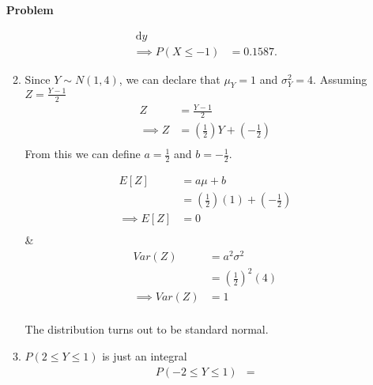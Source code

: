\documentclass[12pt]{article}
\newenvironment{Ex}{\textbf{Problem}\vspace{.75em}\\}{}
\newcommand{\dd}[1]{\:\mathrm{d}{#1}}
\begin{document}
\begin{enumerate}
\begin{Ex}
\begin{solution}
\begin{enumerate}
\begin{multicols}{2}
\begin{equation}
\begin{aligned}
              \dd{y} \\
              \implies P(X \le -1 )&= 0.1587.
            \end{aligned}
          \end{equation}
        \end{multicols}
      \item Since $Y \sim N(1,4)$, we can declare that $\mu_Y = 1$ and
        $\sigma^2_Y = 4$. Assuming $Z = \frac{Y-1}{2}$
        \begin{equation}
          \label{eq:2b-z}
          \begin{aligned}
            Z &= \frac{Y-1}{2} \\
            \implies Z &= \left(\frac{1}{2}\right)Y + \left(-\frac{1}{2}\right) \\
          \end{aligned}
        \end{equation}
        From this we can define $a = \frac{1}{2}$ and $b = -\frac{1}{2}$.
        \begin{multicols}{2}
          \begin{equation}
            \label{eq:2b-e-sol}
            \begin{aligned}
              E[Z] &= a\mu + b \\
              &= \left(\frac{1}{2}\right)(1) + \left(-\frac{1}{2}\right) \\
              \implies E[Z] &= 0\\
            \end{aligned}
          \end{equation} &
          \begin{equation}
            \label{eq:2b-var-sol}
            \begin{aligned}
              Var(Z)&=a^2\sigma^2 \\
              &=\left(\frac{1}{2}\right)^2(4) \\
              \implies Var(Z)&=1 \\
            \end{aligned}
          \end{equation}
        \end{multicols}
        The distribution turns out to be standard normal.
      \item $P(2 \le Y \le 1)$ is just an integral
        \begin{equation}
          \label{eq:2c-sol}
          \begin{aligned}
            P(-2 \le Y \le 1) &=

\end{aligned}
\end{equation}
\end{enumerate}
\end{solution}
\end{Ex}
\end{enumerate}
\end{document}
